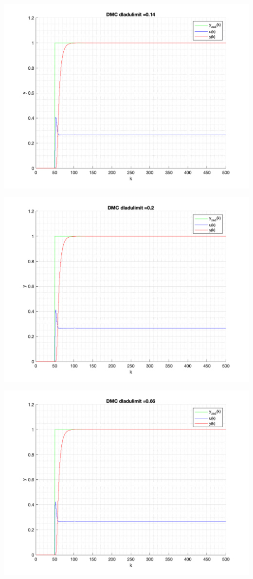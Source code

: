\documentclass[a4paper, 11pt]{article}
\begin{document}
\begin{enumerate}
 \includegraphics[width=\linewidth]{./ModelsP6_dulimit/P4_DMC_dulimit_0_14_png.png} 
 
 \includegraphics[width=\linewidth]{./ModelsP6_dulimit/P4_DMC_dulimit_0_2_png.png} 
 
 \includegraphics[width=\linewidth]{./ModelsP6_dulimit/P4_DMC_dulimit_0_66_png.png} 
 

\end{enumerate}
\end{document}
